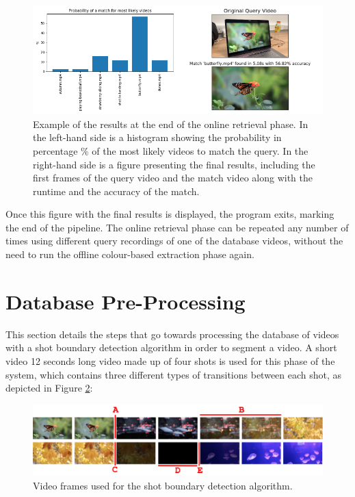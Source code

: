 \begin{figure}[h] 
\centerline{\includegraphics[width=\textwidth]{figures/implementation/online-retrieval-results.png}}
\caption{\label{fig:implementation-online-retrieval-results}Example of the results at the end of the online retrieval phase. In the left-hand side is a histogram showing the probability in percentage \% of the most likely videos to match the query. In the right-hand side is a figure presenting the final results, including the first frames of the query video and the match video along with the runtime and the accuracy of the match.}
\end{figure}

Once this figure with the final results is displayed, the program exits, marking the end of the pipeline. The online retrieval phase can be repeated any number of times using different query recordings of one of the database videos, without the need to run the offline colour-based extraction phase again.


\section{Database Pre-Processing}
\label{sec:database-pre-processing}

This section details the steps that go towards processing the database of videos with a shot boundary detection algorithm in order to segment a video. A short video 12 seconds long video made up of four shots is used for this phase of the system, which contains three different types of transitions between each shot, as depicted in Figure \ref{fig:shot_boundary_detection_frames}:

\begin{figure}[h] 
\centerline{\includegraphics[width=\textwidth]{figures/implementation/shot_boundary_detection_frames.png}}
\caption{\label{fig:shot_boundary_detection_frames}Video frames used for the shot boundary detection algorithm.}
\end{figure}

